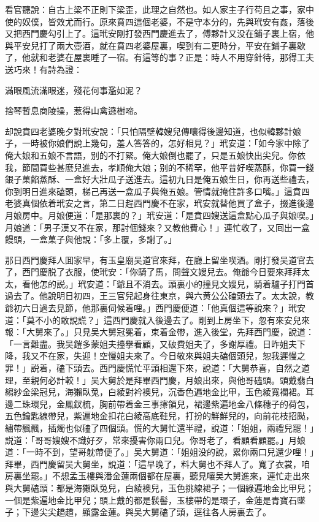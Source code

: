看官聽說：自古上梁不正則下梁歪，此理之自然也。如人家主子行苟且之事，家中使的奴僕，皆效尤而行。原來賁四這個老婆，不是守本分的，先與玳安有姦，落後又把西門慶勾引上了。這玳安剛打發西門慶進去了，傅夥計又没在鋪子裏上宿，他與平安兒打了兩大壺酒，就在賁四老婆屋裏，喫到有二更時分，平安在鋪子裏歇了，他就和老婆在屋裏睡了一宿。有這等的事？正是：時人不用穿針待，那得工夫送巧來！有詩為證：

\begin{myquote}
滿眼風流滿眼迷，殘花何事濫如泥？

捨琴暫息商陵操，惹得山禽遶樹啼。
\end{myquote}

却說賁四老婆晚夕對玳安說：「只怕隔壁韓嫂兒傳嚷得後邊知道，也似韓夥計娘子，一時被你娘們說上幾句，羞人答答的，怎好相見？」玳安道：「如今家中除了俺大娘和五娘不言語，别的不打緊。俺大娘倒也罷了，只是五娘快出尖兒。你依我，節間買些甚麽兒進去，孝順俺大娘；别的不稀罕，他平昔好喫蒸酥，你買一錢銀子菓餡蒸酥、一盒好大壯瓜子送進去。這初九日是俺五娘生日，你再送些禮去，你到明日進來磕頭，梯己再送一盒瓜子與俺五娘。管情就掩住許多口嘴。」這賁四老婆真個依着玳安之言，第二日趕西門慶不在家，玳安就替他買了盒子，掇進後邊月娘房中。月娘便道：「是那裏的？」玳安道：「是賁四嫂送這盒點心瓜子與娘喫。」月娘道：「男子漢又不在家，那討個錢來？又教他費心！」連忙收了，又囘出一盒饅頭，一盒菓子與他說：「多上覆，多謝了。」

那日西門慶拜人囬家早，有玉皇廟吴道官來拜，在廳上留坐喫酒。剛打發吴道官去了，西門慶脱了衣服，使玳安：「你騎了馬，問聲文嫂兒去。俺爺今日要來拜拜太太，看他怎的説。」玳安道：「爺且不消去。頭裏小的撞見文嫂兒，騎着驢子打門首過去了。他說明日初四，王三官兒起身往東京，與六黄公公磕頭去了。太太說，教爺初六日過去見節，他那裏伺候着哩。」西門慶便道：「他真個這等說來？」玳安道：「莫不小的敢說謊？」這西門慶就入後邊去了。剛到上房坐下，忽有來安兒來報：「大舅來了。」只見吴大舅冠冕着，束着金帶，進入後堂，先拜西門慶，說道：「一言難盡。我吴鎧多蒙姐夫擡擧看顧，又破費姐夫了，多謝厚禮。日昨姐夫下降，我又不在家，失迎！空慢姐夫來了。今日敬來與姐夫磕個頭兒，恕我遲慢之罪！」説着，磕下頭去。西門慶慌忙平頭相還下來，說道：「大舅恭喜，自然之道理，至親何必計較！」吴大舅於是拜畢西門慶，月娘出來，與他哥磕頭。頭戴翡白縐紗金梁冠兒，海獺臥兔，白綾對衿襖兒，沉香色遍地金比甲，玉色綾寬襴裙。耳邊二珠環兒，金鳳釵梳，胸前帶着金三事㩟領兒，裙邊紫遍地金八條穗子的荷包，五色鑰匙線帶兒，紫遍地金扣花白綾高底鞋兒，打扮的鮮鮮兒的，向前花枝招颭，繡帶飄飄，插燭也似磕了四個頭。慌的大舅忙還半禮，說道：「姐姐，兩禮兒罷！」説道：「哥哥嫂嫂不識好歹，常來擾害你兩口兒。你哥老了，看顧看顧罷。」月娘道：「一時不到，望哥躭帶便了。」吴大舅道：「姐姐没的說，累你兩口兒還少哩！」拜畢，西門慶留吴大舅坐，說道：「這早晚了，料大舅也不拜人了。寬了衣裳，咱房裏坐罷。」不想孟玉樓與潘金蓮兩個都在屋裏，聽見嚷吴大舅進來，連忙走出來與大舅磕頭：都是海獺臥兔兒，白綾襖兒，玉色挑線裙子；一個綠遍地金比甲兒；一個是紫遍地金比甲兒；頭上戴的都是䯼髻，玉樓帶的是環子，金蓮是青寶石墜子；下邊尖尖趫趫，顯露金蓮。與吴大舅磕了頭，逕往各人房裏去了。

